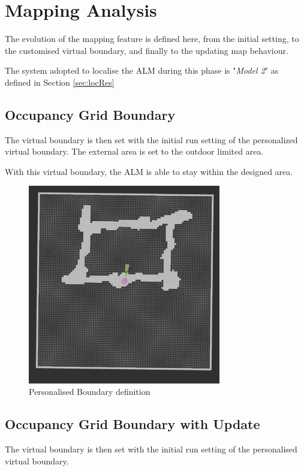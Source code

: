 \section{Mapping Analysis}
\noindent The evolution of the mapping feature is defined here, from the initial setting, to the customised virtual boundary, and finally to the updating map behaviour.

The system adopted to localise the \gls{ALM} during this phase is "\textit{Model 2}" as defined in Section \ref{sec:locRes}


\subsection{Occupancy Grid Boundary}
\noindent
The virtual boundary is then set with the initial run setting of the personalized virtual boundary.
The external area is set to the outdoor limited area.

With this virtual boundary, the \gls{ALM} is able to stay within the designed area.

\begin{figure}[!ht]
	\begin{center}
		\includegraphics[width=0.75\textwidth]{Images/5-Results/BoundaryMap.png}
	\end{center}
	\caption{Personalised Boundary definition}
	\label{fig:occGridBoud}
\end{figure}


\subsection{Occupancy Grid Boundary with Update}
\noindent
The virtual boundary is then set with the initial run setting of the personalised virtual boundary.


